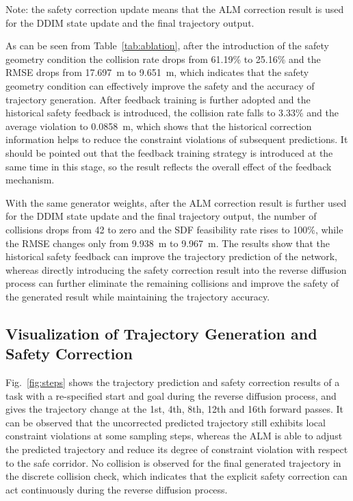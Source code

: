 \documentclass[journal]{IEEEtran}
\begin{document}
Note: the safety correction update means that the ALM correction result is used for the DDIM state update and the final trajectory output.

As can be seen from Table~\ref{tab:ablation}, after the introduction of the safety geometry condition the collision rate drops from 61.19\% to 25.16\% and the RMSE drops from 17.697~m to 9.651~m, which indicates that the safety geometry condition can effectively improve the safety and the accuracy of trajectory generation. After feedback training is further adopted and the historical safety feedback is introduced, the collision rate falls to 3.33\% and the average violation to 0.0858~m, which shows that the historical correction information helps to reduce the constraint violations of subsequent predictions. It should be pointed out that the feedback training strategy is introduced at the same time in this stage, so the result reflects the overall effect of the feedback mechanism.

With the same generator weights, after the ALM correction result is further used for the DDIM state update and the final trajectory output, the number of collisions drops from 42 to zero and the SDF feasibility rate rises to 100\%, while the RMSE changes only from 9.938~m to 9.967~m. The results show that the historical safety feedback can improve the trajectory prediction of the network, whereas directly introducing the safety correction result into the reverse diffusion process can further eliminate the remaining collisions and improve the safety of the generated result while maintaining the trajectory accuracy.

\subsection{Visualization of Trajectory Generation and Safety Correction}

Fig.~\ref{fig:steps} shows the trajectory prediction and safety correction results of a task with a re-specified start and goal during the reverse diffusion process, and gives the trajectory change at the 1st, 4th, 8th, 12th and 16th forward passes. It can be observed that the uncorrected predicted trajectory still exhibits local constraint violations at some sampling steps, whereas the ALM is able to adjust the predicted trajectory and reduce its degree of constraint violation with respect to the safe corridor. No collision is observed for the final generated trajectory in the discrete collision check, which indicates that the explicit safety correction can act continuously during the reverse diffusion process.
\end{document}
